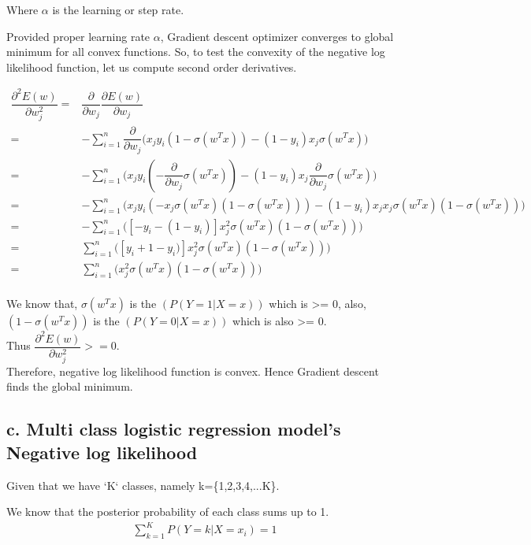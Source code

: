 \documentclass[letterpaper,doc,notimes]{apa6}
\begin{document}
{Where $\alpha$ is the learning or step rate.

Provided proper learning rate $\alpha$, Gradient descent optimizer converges to global minimum for all convex functions. So, to test the convexity of the negative log likelihood function, let us compute second order derivatives.

\begin{align*}
\dfrac{\partial^2 E(w)}{\partial w_j^2} = & \dfrac{\partial}{\partial w_j} \dfrac{\partial E(w)}{\partial w_j} \\
	= & -\sum_{i=1}^{n} \dfrac{\partial}{\partial w_j} \bigg(	x_j y_i (1 - \sigma(w^Tx)) - (1 - y_i ) x_j \sigma(w^Tx) \bigg) \\
	= & -\sum_{i=1}^{n} \bigg( x_j y_i (- \dfrac{\partial}{\partial w_j} \sigma(w^Tx)) - (1 - y_i ) x_j \dfrac{\partial}{\partial w_j} \sigma(w^Tx) \bigg) \\
	= & -\sum_{i=1}^{n} \bigg( x_j y_i (-x_j \sigma(w^Tx) (1 - \sigma(w^Tx))) - (1 - y_i ) x_j x_j  \sigma(w^Tx) (1 - \sigma(w^Tx)) \bigg) \\
	= & -\sum_{i=1}^{n} \bigg( [ -y_i - (1 - y_i ) ] x_j^2 \sigma(w^Tx) (1 - \sigma(w^Tx)) \bigg)  \\
	= & \sum_{i=1}^{n} \bigg([ y_i + 1 - y_i ) ] x_j^2 \sigma(w^Tx) (1 - \sigma(w^Tx)) \bigg)  \\
	= & \sum_{i=1}^{n} \bigg( x_j^2 \sigma(w^Tx) (1 - \sigma(w^Tx)) \bigg) \\
\end{align*}

We know that, $\sigma(w^Tx)$ is the $(P(Y=1|X=x))$ which is  >= 0, also, $(1 - \sigma(w^Tx))$ is the $(P(Y=0|X=x))$ which is also >= 0. \\
Thus $\dfrac{\partial^2 E(w)}{\partial w_j^2} >= 0 $. \\
Therefore, negative log likelihood function is convex.  Hence Gradient descent finds the global minimum.

\subsection{c. Multi class logistic regression model's Negative log likelihood}

Given that we have `K` classes, namely k=\{1,2,3,4,...K\}.

We know that the posterior probability of each class sums up to 1.
\begin{align*}
	\sum_{k=1}^{K} P(Y = k | X = x_i) = 1
\end{align*}

}
\end{document}
